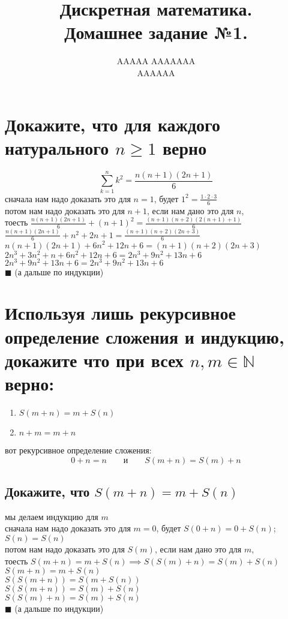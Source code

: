 \documentclass{article}
\title{Дискретная математика. \\ Домашнее задание №1.}
\author{AAAAA AAAAAAA \\ AAAAAA}
\newcommand{\ds}{\displaystyle}
\begin{document}
  \maketitle

  \section{Докажите, что для каждого натурального $n \geq 1$ верно}
  $$\sum_{k=1}^n k^2 = \frac{n(n+1)(2n+1)}{6}$$
  сначала нам надо доказать это для $n=1$, будет $\ds 1^2 = \frac{1 \cdot 2 \cdot 3}{6}$ \\
  потом нам надо доказать это для $n+1$, если нам дано это для $n$, \\
  тоесть $\ds \frac{n(n+1)(2n+1)}{6} + (n+1)^2 = \frac{(n+1)(n+2)(2(n+1)+1)}{6}$ \\
  $\ds \frac{n(n+1)(2n+1)}{6} + n^2 + 2n + 1 = \frac{(n+1)(n+2)(2n+3)}{6}$ \\
  $\ds n(n+1)(2n+1) + 6n^2 + 12n + 6 = (n+1)(n+2)(2n+3)$ \\
  $\ds 2n^3 + 3n^2 + n + 6n^2 + 12n + 6 = 2n^3 + 9n^2 + 13n + 6$ \\
  $\ds 2n^3 + 9n^2 + 13n + 6 = 2n^3 + 9n^2 + 13n + 6$ \\
  $\blacksquare$ (а дальше по индукции)

  \section{Используя лишь рекурсивное определение сложения и индукцию, докажите что при всех $n, m \in \mathbb{N}$ верно:}
  \begin{center}
    \begin{varwidth}{\textwidth}
      \begin{enumerate}
        \item $S(m+n) = m+S(n)$
        \item $n+m = m+n$
      \end{enumerate}
    \end{varwidth}
  \end{center}
  вот рекурсивное определение сложения:
  $$ 0+n=n \qquad \textrm{и} \qquad S(m+n) = S(m)+n $$
  \subsection{Докажите, что $S(m+n) = m+S(n)$}
  \label{recsymetry}
  мы делаем индукцию для $m$ \\
  сначала нам надо доказать это для $m=0$, будет $ S(0+n) = 0+S(n) $; $S(n)=S(n)$ \\
  потом нам надо доказать это для $S(m)$, если нам дано это для $m$, \\
  тоесть $ S(m+n) = m+S(n) \implies S(S(m)+n) = S(m)+S(n) $ \\
  $ S(m+n) = m+S(n) $ \\
  $ S(S(m+n)) = S(m+S(n)) $ \\
  $ S(S(m+n)) = S(m)+S(n) $ \\
  $ S(S(m)+n) = S(m)+S(n) $ \\
  $\blacksquare$ (а дальше по индукции)
\end{document}
